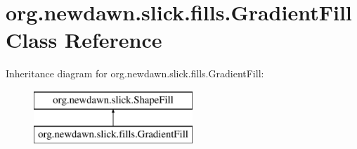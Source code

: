 \hypertarget{classorg_1_1newdawn_1_1slick_1_1fills_1_1_gradient_fill}{}\section{org.\+newdawn.\+slick.\+fills.\+Gradient\+Fill Class Reference}
\label{classorg_1_1newdawn_1_1slick_1_1fills_1_1_gradient_fill}
Inheritance diagram for org.\+newdawn.\+slick.\+fills.\+Gradient\+Fill\+:\begin{figure}[H]
\begin{center}
\leavevmode
\includegraphics[height=2.000000cm]{classorg_1_1newdawn_1_1slick_1_1fills_1_1_gradient_fill}
\end{center}
\end{figure}
